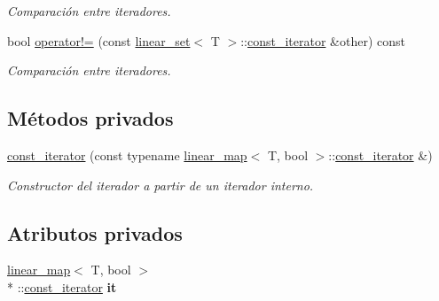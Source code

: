 \begin{DoxyCompactItemize}
\begin{DoxyCompactList}\small\item\em Comparación entre iteradores. \end{DoxyCompactList}\item 
bool \hyperlink{classlinear__set_1_1const__iterator_aaf284dd1decbd51ca0afedb3093da2a7}{operator!=} (const \hyperlink{classlinear__set}{linear\+\_\+set}$<$ T $>$\+::\hyperlink{classlinear__set_1_1const__iterator}{const\+\_\+iterator} \&other) const 
\begin{DoxyCompactList}\small\item\em Comparación entre iteradores. \end{DoxyCompactList}\end{DoxyCompactItemize}
\subsection*{Métodos privados}
\begin{DoxyCompactItemize}
\item 
\hypertarget{classlinear__set_1_1const__iterator_a14bd9ad8205de2c6fab3d8504253ee78}{\hyperlink{classlinear__set_1_1const__iterator_a14bd9ad8205de2c6fab3d8504253ee78}{const\+\_\+iterator} (const typename \hyperlink{classlinear__map}{linear\+\_\+map}$<$ T, bool $>$\+::\hyperlink{classlinear__set_1_1const__iterator}{const\+\_\+iterator} \&)}\label{classlinear__set_1_1const__iterator_a14bd9ad8205de2c6fab3d8504253ee78}

\begin{DoxyCompactList}\small\item\em Constructor del iterador a partir de un iterador interno. \end{DoxyCompactList}\end{DoxyCompactItemize}
\subsection*{Atributos privados}
\begin{DoxyCompactItemize}
\item 
\hypertarget{classlinear__set_1_1const__iterator_a16ef6914efccf16bfcb659df265244f8}{\hyperlink{classlinear__map}{linear\+\_\+map}$<$ T, bool $>$\\*
\+::\hyperlink{classlinear__set_1_1const__iterator}{const\+\_\+iterator} {\bfseries it}}\label{classlinear__set_1_1const__iterator_a16ef6914efccf16bfcb659df265244f8}

\end{DoxyCompactItemize}
